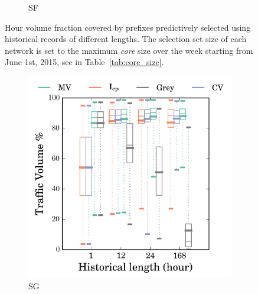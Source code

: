 \begin{figure}
\begin{subfigure}[b]{0.48\textwidth}
                \caption{SF}
                \label{fig:cvg_sf}
        \end{subfigure}
\caption{Hour volume fraction covered by prefixes predictively selected using historical records of different lengths. The selection set size of each network is set to the maximum \textit{core} size over the week starting from June 1st, 2015, see in Table~\ref{tab:core_size}.}
\label{fig:cvg}
\end{figure}

\begin{figure}\ContinuedFloat
	\centering
        \begin{subfigure}[b]{0.48\textwidth}
                \includegraphics[width=\textwidth]{gfx/chap2/grey_cvg_box_method_compare_fs_sg.png}
                \caption{SG}
                \label{fig:cvg_sg}
        \end{subfigure}
        \begin{subfigure}[b]{0.48\textwidth}

\end{subfigure}
\end{figure}
